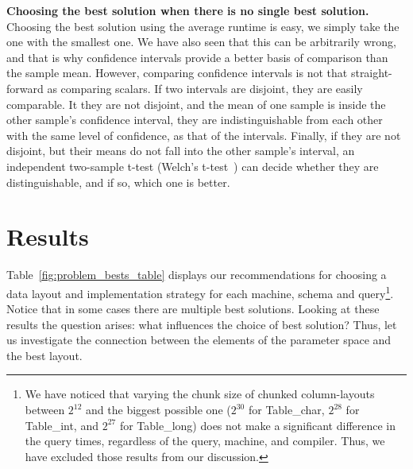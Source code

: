 \documentclass{sig-alternate}
\begin{document}
\noindent\textbf{Choosing the best solution when there is no single best solution.}
Choosing the best solution using the average runtime is easy, we simply take the one with the smallest one. We have also seen that this can be arbitrarily wrong, and that is why confidence intervals provide a better basis of comparison than the sample mean. 
However, comparing confidence intervals is not that straight-forward as comparing scalars. If two intervals are disjoint, they are easily comparable. It they are not disjoint, and the mean of one sample is inside the other sample's confidence interval, they are indistinguishable from each other with the same level of confidence, as that of the intervals. Finally, if they are not disjoint, but their means do not fall into the other sample's interval, an independent two-sample t-test (Welch's t-test~\cite{welch1947generalization}) can decide whether they are distinguishable, and if so, which one is better.

\vspace*{-0.15cm}

\section{Results}


Table~\ref{fig:problem_bests_table} displays our recommendations for choosing a data layout and implementation strategy for each machine, schema and query\footnote{We have noticed that varying the chunk size of chunked column-layouts between $2^{12}$ and the biggest possible one ($2^{30}$ for Table\_char, $2^{28}$ for Table\_int, and $2^{27}$ for Table\_long) does not make a significant difference in the query times, regardless of the query, machine, and compiler. Thus, we have excluded those results from our discussion.
}. Notice that in some cases there are multiple best solutions. Looking at these results the question arises: what influences the choice of best solution? Thus, let us investigate the connection between the elements of the parameter space and the best layout. %
\end{document}
